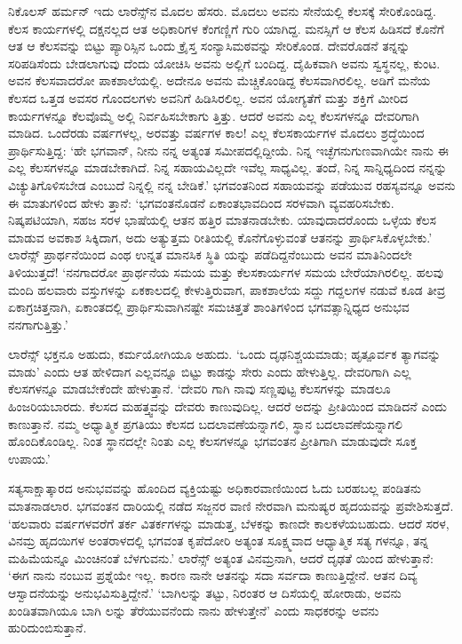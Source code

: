 ನಿಕೊಲಸ್ ಹರ್ಮನ್ ಇದು ಲಾರೆನ್ಸ್​ನ ಮೊದಲ ಹೆಸರು. ಮೊದಲು ಅವನು ಸೇನೆಯಲ್ಲಿ ಕೆಲಸಕ್ಕೆ ಸೇರಿಕೊಂಡಿದ್ದ. ಕೆಲಸ ಕಾರ್ಯಗಳಲ್ಲಿ ದಕ್ಷನಲ್ಲದ ಆತ ಅಧಿಕಾರಿಗಳ ಕೆಂಗಣ್ಣಿಗೆ ಗುರಿ ಯಾಗಿದ್ದ. ಮನಸ್ಸಿಗೆ ಆ ಕೆಲಸ ಹಿಡಿಸದೆ ಕೊನೆಗೆ ಆತ ಆ ಕೆಲಸವನ್ನು ಬಿಟ್ಟು ಪ್ಯಾರಿಸ್ಸಿನ ಒಂದು ಕ್ರೈಸ್ತ ಸಂನ್ಯಾಸಿಮಠವನ್ನು ಸೇರಿಕೊಂಡ. ದೇವರೊಡನೆ ತನ್ನನ್ನು ಸರಿಪಡಿಸೆಂದು ಬೇಡಲಾಗುವು ದೆಂದು ಯೋಚಿಸಿ ಅವನು ಅಲ್ಲಿಗೆ ಬಂದಿದ್ದ. ದೈಹಿಕವಾಗಿ ಅವನು ಸ್ವಸ್ಥನಲ್ಲ, ಕುಂಟ. ಅವನ ಕೆಲಸವಾದರೋ ಪಾಕಶಾಲೆಯಲ್ಲಿ. ಅದೇನೂ ಅವನು ಮೆಚ್ಚಿಕೊಂಡಿದ್ದ ಕೆಲಸವಾಗಿರಲಿಲ್ಲ. ಅಡಿಗೆ ಮನೆಯ ಕೆಲಸದ ಒತ್ತಡ ಅವಸರ ಗೊಂದಲಗಳು ಅವನಿಗೆ ಹಿಡಿಸಿರಲಿಲ್ಲ. ಅವನ ಯೋಗ್ಯತೆಗೆ ಮತ್ತು ಶಕ್ತಿಗೆ ಮೀರಿದ ಕಾರ್ಯಗಳನ್ನೂ ಕೆಲವೊಮ್ಮೆ ಅಲ್ಲಿ ನಿರ್ವಹಿಸಬೇಕಾಗು ತ್ತಿತ್ತು. ಆದರೆ ಅವನು ಎಲ್ಲ ಕೆಲಸಗಳನ್ನೂ ದೇವರಿಗಾಗಿ ಮಾಡಿದ. ಒಂದೆರಡು ವರ್ಷಗಳಲ್ಲ, ಅರವತ್ತು ವರ್ಷಗಳ ಕಾಲ! ಎಲ್ಲ ಕೆಲಸಕಾರ್ಯಗಳ ಮೊದಲು ಶ್ರದ್ಧೆಯಿಂದ ಪ್ರಾರ್ಥಿಸುತ್ತಿದ್ದ: ‘ಹೇ ಭಗವಾನ್, ನೀನು ನನ್ನ ಅತ್ಯಂತ ಸಮೀಪದಲ್ಲಿದ್ದೀಯೆ. ನಿನ್ನ ಇಚ್ಛೆಗನುಗುಣವಾಗಿಯೇ ನಾನು ಈ ಎಲ್ಲ ಕೆಲಸಗಳನ್ನೂ ಮಾಡಬೇಕಾಗಿದೆ. ನಿನ್ನ ಸಹಾಯವಿಲ್ಲದೇ ಇವೆಲ್ಲ ಸಾಧ್ಯವಿಲ್ಲ. ತಂದೆ, ನಿನ್ನ ಸಾನ್ನಿಧ್ಯದಿಂದ ನನ್ನನ್ನು ವಿಚ್ಯುತಿಗೊಳಿಸಬೇಡ ಎಂಬುದೆ ನಿನ್ನಲ್ಲಿ ನನ್ನ ಬೇಡಿಕೆ.’ ಭಗವಂತನಿಂದ ಸಹಾಯವನ್ನು ಪಡೆಯುವ ರಹಸ್ಯವನ್ನೂ ಅವನು ಈ ಮಾತುಗಳಿಂದ ಹೇಳು ತ್ತಾನೆ: ‘ಭಗವಂತನೊಡನೆ ಏಕಾಂತಭಾವದಿಂದ ಸರಳವಾಗಿ ವ್ಯವಹರಿಸಬೇಕು. ನಿಷ್ಕಪಟಿಯಾಗಿ, ಸಹಜ ಸರಳ ಭಾಷೆಯಲ್ಲಿ ಆತನ ಹತ್ತಿರ ಮಾತನಾಡಬೇಕು. ಯಾವುದಾದರೊಂದು ಒಳ್ಳೆಯ ಕೆಲಸ ಮಾಡುವ ಅವಕಾಶ ಸಿಕ್ಕಿದಾಗ, ಅದು ಅತ್ಯುತ್ತಮ ರೀತಿಯಲ್ಲಿ ಕೊನೆಗೊಳ್ಳುವಂತೆ ಆತನನ್ನು ಪ್ರಾರ್ಥಿಸಿಕೊಳ್ಳಬೇಕು.’ ಲಾರೆನ್ಸ್ ಪ್ರಾರ್ಥನೆಯಿಂದ ಎಂಥ ಉನ್ನತ ಮಾನಸಿಕ ಸ್ಥಿತಿ ಯನ್ನು ಪಡೆದಿದ್ದನೆಂಬುದು ಅವನ ಮಾತಿನಿಂದಲೇ ತಿಳಿಯುತ್ತದೆ! ‘ನನಗಾದರೋ ಪ್ರಾರ್ಥನೆಯ ಸಮಯ ಮತ್ತು ಕೆಲಸಕಾರ್ಯಗಳ ಸಮಯ ಬೇರೆಯಾಗಿರಲಿಲ್ಲ. ಹಲವು ಮಂದಿ ಹಲವಾರು ವಸ್ತುಗಳನ್ನು ಏಕಕಾಲದಲ್ಲಿ ಕೇಳುತ್ತಿರುವಾಗ, ಪಾಕಶಾಲೆಯ ಸದ್ದು ಗದ್ದಲಗಳ ನಡುವೆ ಕೂಡ ತೀವ್ರ ಏಕಾಗ್ರಚಿತ್ತನಾಗಿ, ಏಕಾಂತದಲ್ಲಿ ಪ್ರಾರ್ಥಿಸುವಾಗಿನಷ್ಟೇ ಸಮಚಿತ್ತತೆ ಶಾಂತಿಗಳಿಂದ ಭಗವತ್ಸಾನ್ನಿಧ್ಯದ ಅನುಭವ ನನಗಾಗುತ್ತಿತ್ತು.’

ಲಾರೆನ್ಸ್ ಭಕ್ತನೂ ಅಹುದು, ಕರ್ಮಯೋಗಿಯೂ ಅಹುದು. ‘ಒಂದು ದೃಢನಿಶ್ಚಯಮಾಡು; ಹೃತ್ಪೂರ್ವಕ ತ್ಯಾಗವನ್ನು ಮಾಡು’ ಎಂದು ಆತ ಹೇಳಿದಾಗ ಎಲ್ಲವನ್ನೂ ಬಿಟ್ಟು ಕಾಡನ್ನು ಸೇರು ಎಂದು ಹೇಳುತ್ತಿಲ್ಲ. ದೇವರಿಗಾಗಿ ಎಲ್ಲ ಕೆಲಸಗಳನ್ನೂ ಮಾಡಬೇಕೆಂದೇ ಹೇಳುತ್ತಾನೆ. ‘ದೇವರಿ ಗಾಗಿ ನಾವು ಸಣ್ಣಪುಟ್ಟ ಕೆಲಸಗಳನ್ನು ಮಾಡಲೂ ಹಿಂಜರಿಯಬಾರದು. ಕೆಲಸದ ಮಹತ್ತ್ವವನ್ನು ದೇವರು ಕಾಣುವುದಿಲ್ಲ. ಆದರೆ ಅದನ್ನು ಪ್ರೀತಿಯಿಂದ ಮಾಡಿದನೆ ಎಂದು ಕಾಣುತ್ತಾನೆ. ನಮ್ಮ ಅಧ್ಯಾತ್ಮಿಕ ಪ್ರಗತಿಯು ಕೆಲಸದ ಬದಲಾವಣೆಯನ್ನಾಗಲಿ, ಸ್ಥಾನ ಬದಲಾವಣೆಯನ್ನಾಗಲಿ ಹೊಂದಿಕೊಂಡಿಲ್ಲ. ನಿಂತ ಸ್ಥಾನದಲ್ಲೇ ನಿಂತು ಎಲ್ಲ ಕೆಲಸಗಳನ್ನೂ ಭಗವಂತನ ಪ್ರೀತಿಗಾಗಿ ಮಾಡುವುದೇ ಸೂಕ್ತ ಉಪಾಯ.’

ಸತ್ಯಸಾಕ್ಷಾತ್ಕಾರದ ಅನುಭವವನ್ನು ಹೊಂದಿದ ವ್ಯಕ್ತಿಯಷ್ಟು ಅಧಿಕಾರವಾಣಿಯಿಂದ ಓದು ಬರಹಬಲ್ಲ ಪಂಡಿತನು ಮಾತನಾಡಲಾರ. ಭಗವಂತನ ದಾರಿಯಲ್ಲಿ ನಡೆದ ಸಜ್ಜನರ ವಾಣಿ ನೇರವಾಗಿ ಮನುಷ್ಯರ ಹೃದಯವನ್ನು ಪ್ರವೇಶಿಸುತ್ತದೆ. ‘ಹಲವಾರು ವರ್ಷಗಳವರೆಗೆ ತರ್ಕ ವಿತರ್ಕಗಳನ್ನು ಮಾಡುತ್ತ, ಬೆಳಕನ್ನು ಕಾಣದೇ ಕಾಲಕಳೆಯಬಹುದು. ಆದರೆ ಸರಳ, ವಿನಮ್ರ ಹೃದಯಿಗಳ ಅಂತರಾಳದಲ್ಲಿ ಭಗವಂತ ಕೃಪೆದೋರಿ ಅತ್ಯಂತ ಸೂಕ್ಷ್ಮವಾದ ಆಧ್ಯಾತ್ಮಿಕ ಸತ್ಯ ಗಳನ್ನೂ, ತನ್ನ ಮಹಿಮೆಯನ್ನೂ ಮಿಂಚಿನಂತೆ ಬೆಳಗುವನು.’ ಲಾರೆನ್ಸ್ ಅತ್ಯಂತ ವಿನಮ್ರನಾಗಿ, ಆದರೆ ದೃಢತೆ ಯಿಂದ ಹೇಳುತ್ತಾನೆ: ‘ಈಗ ನಾನು ನಂಬುವ ಪ್ರಶ್ನೆಯೇ ಇಲ್ಲ. ಕಾರಣ ನಾನೇ ಆತನನ್ನು ಸದಾ ಸರ್ವದಾ ಕಾಣುತ್ತಿದ್ದೇನೆ. ಆತನ ದಿವ್ಯ ಆಸ್ವಾದನೆಯನ್ನು ಅನುಭವಿಸುತ್ತಿದ್ದೇನೆ.’ ‘ಬಾಗಿಲನ್ನು ತಟ್ಟು, ನಿರಂತರ ಆ ದಿಸೆಯಲ್ಲಿ ಹೋರಾಡು, ಅವನು ಖಂಡಿತವಾಗಿಯೂ ಬಾಗಿ ಲನ್ನು ತೆರೆಯುವನೆಂದು ನಾನು ಹೇಳುತ್ತೇನೆ’ ಎಂದು ಸಾಧಕರನ್ನು ಅವನು ಹುರಿದುಂಬಿಸುತ್ತಾನೆ.

